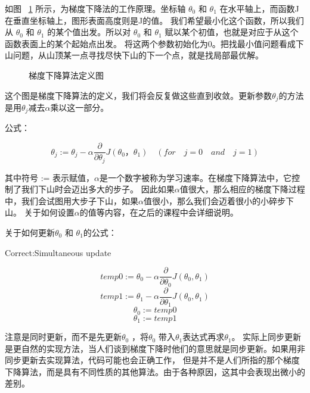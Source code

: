 \documentclass[UTF8]{ctexart}
\begin{document}
如图 ~\ref{fig:5} 所示，为梯度下降法的工作原理。坐标轴 $\theta_0$ 和 $\theta_1$ 在水平轴上，而函数J在垂直坐标轴上，图形表面高度则是J的值。
我们希望最小化这个函数，所以我们从 $\theta_0$ 和 $\theta_1$ 的某个值出发。所以对 $\theta_0$ 和 $\theta_1$ 赋以某个初值，也就是对应于从这个函数表面上的某个起始点出发。
将这两个参数初始化为0。把找最小值问题看成下山问题，从山顶某一点寻找尽快下山的下一个点，就是找局部最优解。
\begin{figure}[htb]
 \caption{梯度下降算法定义图}
 \label{fig:5}
\end{figure}

这个图是梯度下降算法的定义，我们将会反复做这些直到收敛。更新参数$\theta_j$的方法是用$\theta_j$减去$\alpha$乘以这一部分。

公式：

\begin{equation*}
  \theta_j := \theta_j - \alpha
  \frac{\partial}{\partial\theta_j}
  J(\theta_0，\theta_1)   \quad  (for \quad j=0 \quad and \quad j=1)
\end{equation*}

其中符号 := 表示赋值，$\alpha$是一个数字被称为学习速率。在梯度下降算法中，它控制了我们下山时会迈出多大的步子。
因此如果$\alpha$值很大，那么相应的梯度下降过程中，我们会试图用大步子下山，如果$\alpha$值很小，那么我们会迈着很小的小碎步下山。
关于如何设置$\alpha$的值等内容，在之后的课程中会详细说明。

关于如何更新$\theta_0$ 和 $\theta_1$的公式：

Correct:Simultaneous update

\begin{equation*}
  temp 0 := \theta_0 - \alpha
  \frac{\partial}{\partial\theta_0}
  J(\theta_0,\theta_1)
\end{equation*}
\begin{equation*}
  temp 1 := \theta_1 - \alpha
  \frac{\partial}{\partial\theta_1}
  J(\theta_0,\theta_1)
\end{equation*}
\begin{equation*}
  \theta_0 := temp 0
\end{equation*}
\begin{equation*}
\theta_1 := temp 1
\end{equation*}

注意是同时更新，而不是先更新$\theta_0$ ，将$\theta_0$ 带入$\theta_1$表达式再求$\theta_1$。
实际上同步更新是更自然的实现方法，当人们谈到梯度下降时他们的意思就是同步更新。如果用非同步更新去实现算法，代码可能也会正确工作，
但是并不是人们所指的那个梯度下降算法，而是具有不同性质的其他算法。由于各种原因，这其中会表现出微小的差别。
\end{document}
